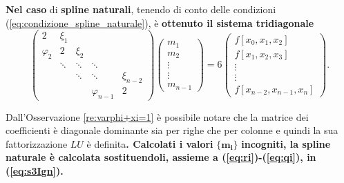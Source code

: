 \textbf{Nel caso} di \textbf{spline naturali}, tenendo di conto delle condizioni (\ref{eq:condizione_spline_naturale}), è \textbf{ottenuto il sistema tridiagonale} 
\begin{equation*}
    \begin{pmatrix}
        2 & \xi_1 & && \\
        \varphi_2 & 2 & \xi_2&&\\
        &\ddots & \ddots &\ddots&\\
        &&\ddots & \ddots &\xi_{n-2}\\
        &&&\varphi_{n-1} & 2
    \end{pmatrix}\begin{pmatrix}
        m_1\\
        m_2\\
        \vdots\\
        \vdots\\
        m_{n-1}
    \end{pmatrix}=6\begin{pmatrix}
        f[x_0,x_1,x_2]\\
        f[x_1,x_2,x_3]\\
        \vdots\\
        \vdots\\
        f[x_{n-2},x_{n-1},x_n]
    \end{pmatrix}.
\end{equation*}

Dall'Osservazione \ref{re:varphi+xi=1} è possibile notare che la matrice dei coefficienti è diagonale dominante sia per righe che per colonne e quindi la sua fattorizzazione $LU$ è definita\textbf{. Calcolati i valori} $\boldsymbol{\{m_i\}}$ \textbf{incogniti, la spline naturale è calcolata sostituendoli, assieme a (\ref{eq:ri})-(\ref{eq:qi}), in (\ref{eq:s3Ign}).}

